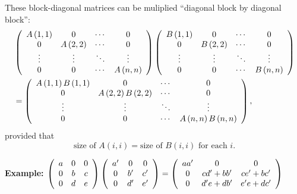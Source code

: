 \documentclass[numbers=enddot,12pt,final,onecolumn,notitlepage]{scrartcl}%
\numberwithin{exer}{subsection}
\theoremstyle{definition}
\begin{document}
These block-diagonal matrices can be muliplied \textquotedblleft diagonal
block by diagonal block\textquotedblright:%
\begin{align*}
& \left(
\begin{array}
[c]{cccc}%
A\left(  1,1\right)   & 0 & \cdots & 0\\
0 & A\left(  2,2\right)   & \cdots & 0\\
\vdots & \vdots & \ddots & \vdots\\
0 & 0 & \cdots & A\left(  n,n\right)
\end{array}
\right)  \left(
\begin{array}
[c]{cccc}%
B\left(  1,1\right)   & 0 & \cdots & 0\\
0 & B\left(  2,2\right)   & \cdots & 0\\
\vdots & \vdots & \ddots & \vdots\\
0 & 0 & \cdots & B\left(  n,n\right)
\end{array}
\right)  \\
& =\left(
\begin{array}
[c]{cccc}%
A\left(  1,1\right)  B\left(  1,1\right)   & 0 & \cdots & 0\\
0 & A\left(  2,2\right)  B\left(  2,2\right)   & \cdots & 0\\
\vdots & \vdots & \ddots & \vdots\\
0 & 0 & \cdots & A\left(  n,n\right)  B\left(  n,n\right)
\end{array}
\right)  ,
\end{align*}
provided that
\[
\text{size of }A\left(  i,i\right)  =\text{size of }B\left(  i,i\right)
\text{ for each }i.
\]


\textbf{Example:} $\left(
\begin{array}
[c]{ccc}%
a & 0 & 0\\
0 & b & c\\
0 & d & e
\end{array}
\right)  \left(
\begin{array}
[c]{ccc}%
a^{\prime} & 0 & 0\\
0 & b^{\prime} & c^{\prime}\\
0 & d^{\prime} & e^{\prime}%
\end{array}
\right)  =\allowbreak\left(
\begin{array}
[c]{ccc}%
aa^{\prime} & 0 & 0\\
0 & cd^{\prime}+bb^{\prime} & ce^{\prime}+bc^{\prime}\\
0 & d^{\prime}e+db^{\prime} & e^{\prime}e+dc^{\prime}%
\end{array}
\right)  \allowbreak$
\end{document}

